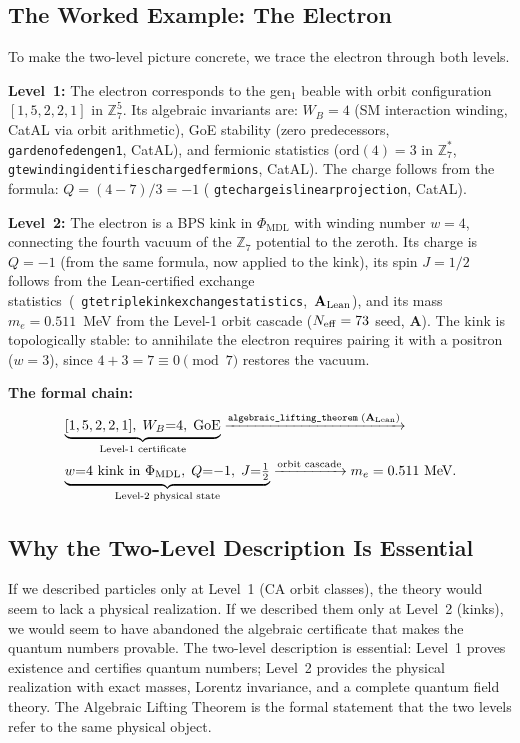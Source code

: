\documentclass[11pt,openany]{book}
\theoremstyle{remark}
\newcommand{\PHIMDL}{\Phi_{\mathrm{MDL}}}
\newcommand{\ZS}{\mathbb{Z}_7}
\newcommand{\lean}[1]{%
  \penalty-100
  \begingroup\def\_{\textunderscore\allowbreak}\texttt{#1}\endgroup}
\newcommand{\CatA}{\textbf{A}}
\newcommand{\CatAL}{\ensuremath{\textbf{A}_{\rm Lean}}}
\begin{document}
\subsection*{The Worked Example: The Electron}

To make the two-level picture concrete, we trace the electron through both levels.

\textbf{Level~1:} The electron corresponds to the gen$_1$ beable with
orbit configuration $[1,5,2,2,1]$ in $\ZS^5$.
Its algebraic invariants are: $W_B = 4$ (SM interaction winding, CatAL via orbit arithmetic),
GoE stability (zero predecessors, \lean{garden\_of\_eden\_gen1}, CatAL),
and fermionic statistics (ord$(4) = 3$ in $\mathbb{Z}_7^*$,
\lean{gte\_winding\_identifies\_charged\_fermions}, CatAL).
The charge follows from the formula: $Q = (4-7)/3 = -1$
(\lean{gte\_charge\_is\_linear\_projection}, CatAL).

\textbf{Level~2:} The electron is a BPS kink in $\PHIMDL$ with winding number $w=4$,
connecting the fourth vacuum of the $\ZS$ potential to the zeroth.
Its charge is $Q = -1$ (from the same formula, now applied to the kink), its spin
$J = 1/2$ follows from the Lean-certified exchange statistics~\mbox{(\lean{gte\_triple\_kink\_exchange\_statistics}, \CatAL)}, and its mass
$m_e = 0.511$~MeV from the Level-1 orbit cascade ($N_{\rm eff}=73$ seed, \CatA).
The kink is topologically stable: to annihilate the electron requires pairing it
with a positron ($w=3$), since $4 + 3 = 7 \equiv 0 \pmod{7}$ restores the vacuum.

\textbf{The formal chain:}
\begin{align*}
&\underbrace{[1,5,2,2,1],\; W_B{=}4,\;\text{GoE}}_{\text{Level-1 certificate}}
\xrightarrow{\lean{algebraic\_lifting\_theorem}\;(\CatAL)}\\
&\underbrace{w{=}4 \text{ kink in }\PHIMDL,\;Q{=}{-}1,\;J{=}{\tfrac{1}{2}}}_{\text{Level-2 physical state}}
\xrightarrow{\text{orbit cascade}}
m_e = 0.511\text{ MeV}.
\end{align*}

\subsection*{Why the Two-Level Description Is Essential}

If we described particles only at Level~1 (CA orbit classes), the theory would
seem to lack a physical realization.
If we described them only at Level~2 (kinks), we would seem to have abandoned
the algebraic certificate that makes the quantum numbers provable.
The two-level description is essential:
Level~1 proves existence and certifies quantum numbers;
Level~2 provides the physical realization with exact masses, Lorentz invariance, and
a complete quantum field theory.
The Algebraic Lifting Theorem is the formal statement that the two levels
refer to the same physical object.
\end{document}
